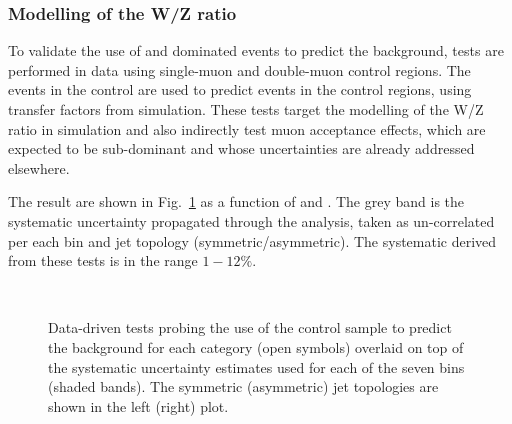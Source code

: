 \subsubsection*{Modelling of the W/Z ratio}
\label{sec:tfSyst_WZratio}
To validate the use of \wmj and \ttbar dominated \mj events to predict the \znunu
background, tests are performed in data using single-muon and double-muon control regions. 
The events in the \mj control are used to predict events in the \mmj control regions, 
using transfer factors from simulation. 
These tests target the modelling of the W/Z ratio in simulation and 
also indirectly test muon acceptance effects, which 
are expected to be sub-dominant and whose uncertainties are already addressed elsewhere.

The result are shown in Fig.~\ref{fig:closureMuToMuMu} as a function of \scalht and \njet. 
The grey band is the systematic uncertainty propagated through the analysis, 
taken as un-correlated per each \scalht bin and jet topology (symmetric/asymmetric). The systematic derived from these tests is
in the range $1-12\%$.



\begin{figure}[h!]
  \begin{center}
    ~~
    \caption{Data-driven tests probing the use of the \mj control sample
      to predict the \znunu background for each
      \njet category (open symbols) overlaid on top of the systematic
      uncertainty estimates used for each of the seven \scalht bins (shaded bands).  
      The symmetric (asymmetric) jet topologies are shown in the left (right) plot. 
    }
    \label{fig:closureMuToMuMu}
  \end{center} 
\end{figure}




